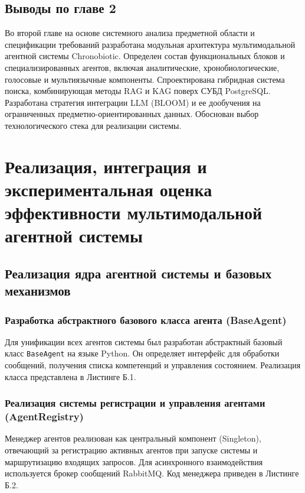 \documentclass[a4paper,14pt]{extarticle}
\begin{document}
	\subsection*{Выводы по главе 2}
	
	Во второй главе на основе системного анализа предметной области и спецификации требований разработана модульная архитектура мультимодальной агентной системы Chronobiotic. Определен состав функциональных блоков и специализированных агентов, включая аналитические, хронобиологические, голосовые и мультиязычные компоненты. Спроектирована гибридная система поиска, комбинирующая методы RAG и KAG поверх СУБД PostgreSQL. Разработана стратегия интеграции LLM (BLOOM) и ее дообучения на ограниченных предметно-ориентированных данных. Обоснован выбор технологического стека для реализации системы.
	
	\newpage
	
	\section{Реализация, интеграция и экспериментальная оценка эффективности мультимодальной агентной системы}
	
	\subsection{Реализация ядра агентной системы и базовых механизмов}
	
	\subsubsection{Разработка абстрактного базового класса агента (BaseAgent)}
	Для унификации всех агентов системы был разработан абстрактный базовый класс \texttt{BaseAgent} на языке Python. Он определяет интерфейс для обработки сообщений, получения списка компетенций и управления состоянием. Реализация класса представлена в Листинге Б.1.
	
	\subsubsection{Реализация системы регистрации и управления агентами (AgentRegistry)}
	Менеджер агентов реализован как центральный компонент (Singleton), отвечающий за регистрацию активных агентов при запуске системы и маршрутизацию входящих запросов. Для асинхронного взаимодействия используется брокер сообщений RabbitMQ. Код менеджера приведен в Листинге Б.2.
	
\end{document}
